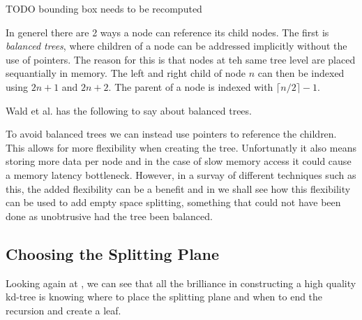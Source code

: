 TODO bounding box needs to be recomputed


In generel there are 2 ways a node can reference its child nodes. The
first is \textit{balanced trees}, where children of a node can be
addressed implicitly without the use of pointers. The reason for this
is that nodes at teh same tree level are placed sequantially in
memory. The left and right child of node $n$ can then be indexed using
$2n+1$ and $2n+2$. The parent of a node is indexed with $\lceil n/2
\rceil - 1$.


Wald et al. has the following to say about
balanced trees.



To avoid balanced trees we can instead use pointers to reference the
children. This allows for more flexibility when creating the tree.
Unfortunatly it also means storing more data per node and in the case
of slow memory access it could cause a memory latency
bottleneck. However, in a survay of different techniques such as this,
the added flexibility can be a benefit and in
 we shall see how this flexibility can
be used to add empty space splitting, something that could not have
been done as unobtrusive had the tree been balanced.




\subsection{Choosing the Splitting Plane}\label{sec:splittingPlane}


Looking again at , we can see that all the
brilliance in constructing a high quality kd-tree is knowing where to
place the splitting plane and when to end the recursion and create a
leaf.

